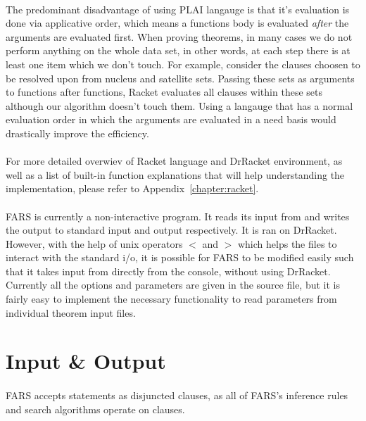\documentclass[11pt]{report}
\begin{document}
\paragraph{} The predominant disadvantage of using PLAI langauge is that it's evaluation is done via applicative order, which means a functions body is evaluated \emph{after} the arguments are evaluated first. When proving theorems, in many cases we do not perform anything on the whole data set, in other words, at each step there is at least one item which we don't touch. For example, consider the clauses choosen to be resolved upon from nucleus and satellite sets. Passing these sets as arguments to functions after functions, Racket evaluates all clauses within these sets although our algorithm doesn't touch them. Using a langauge that has a normal evaluation order in which the arguments are evaluated in a need basis would drastically improve the efficiency. 

\paragraph{} For more detailed overwiev of Racket language and DrRacket environment, as well as a list of built-in function explanations that will help understanding the implementation, please refer to Appendix~\ref{chapter:racket}.

\paragraph{} FARS is currently a non-interactive program. It reads its input from and writes the output to standard input and output respectively. It is ran on DrRacket. However, with the help of unix operators $<$ and $>$ which helps the files to interact with the standard i/o, it is possible for FARS to be modified easily such that it takes input from directly from the console, without using DrRacket. Currently all the options and parameters are given in the source file, but it is fairly easy to implement the necessary functionality to read parameters from individual theorem input files.

\section{Input \& Output}
\label{section:inputs}

\paragraph{} FARS accepts statements as disjuncted clauses, as all of FARS's inference rules and search algorithms operate on clauses.
\end{document}
